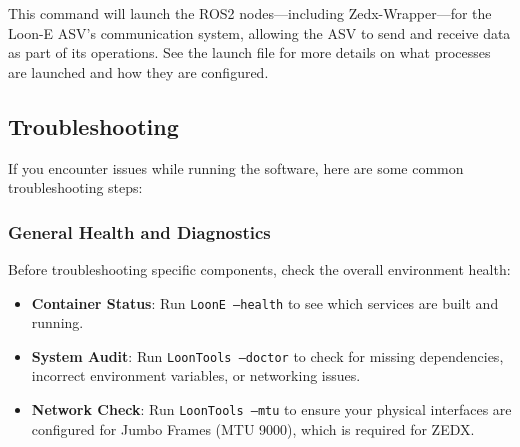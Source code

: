 This command will launch the ROS2 nodes---including Zedx-Wrapper---for the Loon-E ASV's communication system, allowing the ASV to send and receive data as part of its operations. See the launch file for more details on what processes are launched and how they are configured.


\subsection{Troubleshooting}

If you encounter issues while running the software, here are some common troubleshooting steps:

\subsubsection{General Health and Diagnostics}
Before troubleshooting specific components, check the overall environment health:

\begin{itemize}
    \item \textbf{Container Status}: Run \texttt{LoonE --health} to see which services are built and running.
    \item \textbf{System Audit}: Run \texttt{LoonTools --doctor} to check for missing dependencies, incorrect environment variables, or networking issues.
    \item \textbf{Network Check}: Run \texttt{LoonTools --mtu} to ensure your physical interfaces are configured for Jumbo Frames (MTU 9000), which is required for ZEDX.
\end{itemize}

